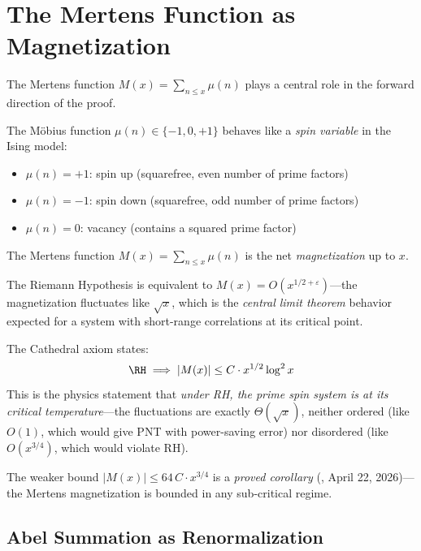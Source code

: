 \section{The Mertens Function as Magnetization}
\label{sec:mertens}

The Mertens function $M(x) = \sum_{n \leq x} \mu(n)$ plays a central
role in the forward direction of the proof.

\begin{correspondence}
The M\"obius function $\mu(n) \in \{-1, 0, +1\}$ behaves like a
\emph{spin variable} in the Ising model:
\begin{itemize}
  \item $\mu(n) = +1$: spin up (squarefree, even number of prime factors)
  \item $\mu(n) = -1$: spin down (squarefree, odd number of prime factors)
  \item $\mu(n) = 0$: vacancy (contains a squared prime factor)
\end{itemize}
The Mertens function $M(x) = \sum_{n \leq x} \mu(n)$ is the net
\emph{magnetization} up to $x$.

The Riemann Hypothesis is equivalent to $M(x) = O(x^{1/2+\varepsilon})$---the
magnetization fluctuates like $\sqrt{x}$, which is the \emph{central limit
theorem} behavior expected for a system with short-range correlations at
its critical point.
\end{correspondence}

The Cathedral axiom  states:
\[
  \RH \implies |M(x)| \leq C \cdot x^{1/2} \log^2 x
\]
This is the physics statement that \emph{under RH, the prime spin system
is at its critical temperature}---the fluctuations are exactly
$\Theta(\sqrt{x})$, neither ordered (like $O(1)$, which would give PNT
with power-saving error) nor disordered (like $O(x^{3/4})$, which would
violate RH).

The weaker bound $|M(x)| \leq 64\, C \cdot x^{3/4}$ is a \emph{proved
corollary} (, April 22, 2026)---the Mertens
magnetization is bounded in any sub-critical regime.

\subsection{Abel Summation as Renormalization}

